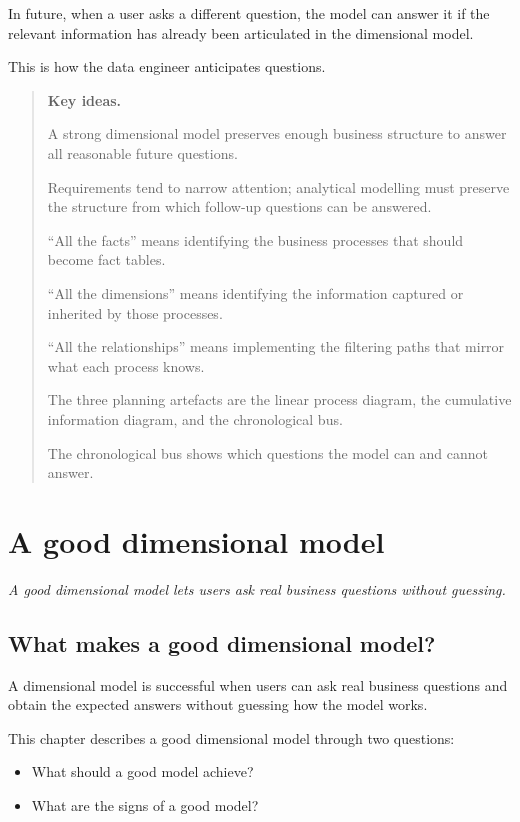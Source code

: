\documentclass[10pt,openany,10pt]{book}
\providecommand{\tightlist}{%
  \setlength{\itemsep}{0pt}\setlength{\parskip}{0pt}}
\begin{document}
In future, when a user asks a different question, the model can answer
it if the relevant information has already been articulated in the
dimensional model.

This is how the data engineer anticipates questions.

\begin{quote}
\textbf{Key ideas.}

A strong dimensional model preserves enough business structure to answer
all reasonable future questions.

Requirements tend to narrow attention; analytical modelling must
preserve the structure from which follow-up questions can be answered.

``All the facts'' means identifying the business processes that should
become fact tables.

``All the dimensions'' means identifying the information captured or
inherited by those processes.

``All the relationships'' means implementing the filtering paths that
mirror what each process knows.

The three planning artefacts are the linear process diagram, the
cumulative information diagram, and the chronological bus.

The chronological bus shows which questions the model can and cannot
answer.
\end{quote}

\newpage

\chapter{A good dimensional
model}\label{docs-presenting-insights-a-good-dimensional-model}

\emph{A good dimensional model lets users ask real business questions
without guessing.}

\section{What makes a good dimensional
model?}\label{what-makes-a-good-dimensional-model}

A dimensional model is successful when users can ask real business
questions and obtain the expected answers without guessing how the model
works.

This chapter describes a good dimensional model through two questions:

\begin{itemize}
\tightlist
\item
  What should a good model achieve?
\item
  What are the signs of a good model?
\end{itemize}
\end{document}

